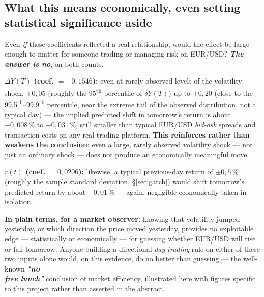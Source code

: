 \documentclass[12pt,a4paper]{article}
\begin{document}
\newpage
\subsection{What this means economically, even setting statistical significance aside}

\begin{econbox}
	Even \emph{if} these coefficients reflected a real relationship,
	would the effect be large enough to matter for someone
	trading or managing risk on EUR/USD? \textbf{\textit{The answer is no}}, on
	both counts.
	
	\vspace{0.2cm}		
	\textbf{$\Delta Y(T)$ (coef. $=-0{,}1546$):} even at rarely
	observed levels of the volatility shock, $\pm 0{,}05$
	(roughly the 95\textsuperscript{th} percentile of
	\texttt{$\delta Y(T)$}) up to $\pm 0{,}20$ (close to the
	99.5\textsuperscript{th}--99.9\textsuperscript{th} percentile, near the
	extreme tail of the observed distribution, not a
	typical day) --- the implied predicted shift in tomorrow's return
	is about $-0{,}008\,\%$ to $-0{,}031\,\%$, still smaller than
	typical EUR/USD \emph{bid-ask} spreads and transaction costs on
	any real trading platform. \textbf{This
		reinforces rather than weakens the conclusion}: even a large,
	rarely observed volatility shock --- not just an
	ordinary shock --- does not produce an economically
	meaningful move.
	
	\vspace{0.2cm}
	
	\textbf{$r(t)$ (coef. $=0{,}0206$):} likewise, a typical
	previous-day return of $\pm 0{,}5\,\%$ (roughly the sample
	standard deviation, \S\ref{sec:garch}) would shift tomorrow's
	predicted return by about $\pm 0{,}01\,\%$ --- again, negligible
	economically taken in isolation.
	
	\vspace{0.2cm}
	
	\textbf{In plain terms, for a market observer:} knowing that
	volatility jumped yesterday, or which direction the price moved
	yesterday, provides no exploitable edge --- statistically or
	economically --- for guessing whether EUR/USD will rise or fall
	tomorrow. Anyone building a directional \emph{day-trading}
	rule on either of these two inputs alone
	would, on this evidence, do no better than guessing --- the
	well-known \textbf{\textit{"no \\free lunch"}} conclusion of market efficiency, illustrated here with figures specific to this
	project rather than asserted in the abstract.
\end{econbox}
\end{document}
